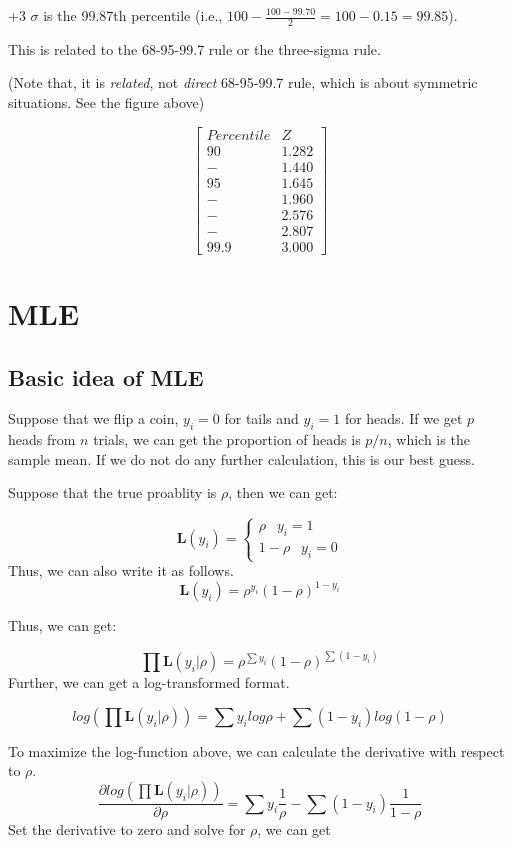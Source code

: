 \documentclass[]{book}
\begin{document}
+3 \(\sigma\) is the 99.87th percentile (i.e., \(100-\frac{100-99.70}{2}=100-0.15=99.85\)).

This is related to the 68-95-99.7 rule or the three-sigma rule.

(Note that, it is \emph{related}, not \emph{direct} 68-95-99.7 rule, which is about symmetric situations. See the figure above)

\[\begin{bmatrix}
Percentile & Z \\
90  & 1.282 \\
- & 1.440 \\
95 & 1.645 \\
- & 1.960 \\
- & 2.576 \\
- & 2.807 \\
99.9 & 3.000 \end{bmatrix}\]

\hypertarget{intro}{%
\chapter{MLE}\label{intro}}

\hypertarget{basic-idea-of-mle}{%
\section{Basic idea of MLE}\label{basic-idea-of-mle}}

Suppose that we flip a coin, \(y_i=0\) for tails and \(y_i=1\) for heads. If we get \(p\) heads from \(n\) trials, we can get the proportion of heads is \(p/n\), which is the sample mean. If we do not do any further calculation, this is our best guess.

Suppose that the true proablity is \(\rho\), then we can get:

\[
\mathbf{L}(y_i)=\begin{cases} \rho \;\;\:   y_i = 1 \\ 1-\rho \;\;\:  y_i = 0 \end{cases}
\]
Thus, we can also write it as follows.
\[\mathbf{L}(y_i) = \rho^{y_i}(1-\rho)^{1-y_i}\]

Thus, we can get:

\[\prod \mathbf{L}(y_i|\rho)=\rho^{\sum y_i}(1-\rho)^{\sum(1-y_i)}\]
Further, we can get a log-transformed format.

\[log (\prod \mathbf{L}(y_i|\rho))=\sum y_i log \rho + \sum(1-y_i) log(1-\rho)\]

To maximize the log-function above, we can calculate the derivative with respect to \(\rho\).
\[\frac{\partial log (\prod \mathbf{L}(y_i|\rho)) }{\partial \rho}=\sum y_i \frac{1}{\rho}-\sum(1-y_i) \frac{1}{1-\rho}\]
Set the derivative to zero and solve for \(\rho\), we can get
\end{document}
